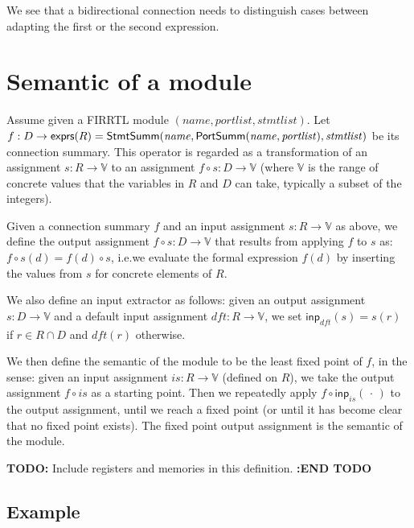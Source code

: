 \documentclass[a4paper]{article}
\newcommand{\portsem}{\mathsf{PortSumm}}
\newcommand{\stmtsem}{\mathsf{StmtSumm}}
\newcommand{\expressions}{\mathsf{exprs}}
\newcommand{\extractinput}[2]{\mathsf{inp}_{#2}(#1)}
\begin{document}
We see that a bidirectional connection needs to distinguish cases between adapting the first or the second expression.

\section{Semantic of a module}

Assume given a FIRRTL module $(\mathit{name}, \mathit{portlist}, \mathit{stmtlist})$.
Let $f: D \to \expressions(R) = \stmtsem(\mathit{name}, \linebreak[0] \portsem(\mathit{name}, \linebreak[0] \mathit{portlist}), \linebreak[0] \mathit{stmtlist})$ be its connection summary.
This operator is regarded as a transformation of an assignment $s: R \to \mathbb{V}$
to an assignment $f \circ s: D \to \mathbb{V}$
(where $\mathbb{V}$ is the range of concrete values that the variables in $R$ and $D$ can take, typically a subset of the integers).

Given a connection summary $f$ and an input assignment $s: R \to \mathbb{V}$ as above, we define the output assignment $f \circ s: D \to \mathbb{V}$ that results from applying $f$ to $s$ as:
$f \circ s(d) = f(d) \circ s$, i.e.\@ we evaluate the formal expression $f(d)$ by inserting the values from $s$ for concrete elements of $R$.

We also define an input extractor as follows: given an output assignment $s : D \to \mathbb{V}$ and a default input assignment $\mathit{dft} : R \to \mathbb{V}$,
we set $\extractinput{s}{\mathit{dft}} = s(r)$ if $r \in R \cap D$ and $\mathit{dft}(r)$ otherwise.

We then define the semantic of the module to be the least fixed point of $f$, in the sense:
given an input assignment $\mathit{is} : R \to \mathbb{V}$ (defined on $R$),
we take the output assignment $f \circ \mathit{is}$ as a starting point.
Then we repeatedly apply $f \circ \extractinput{\,\cdot\,}{\mathit{is}}$ to the output assignment, until we reach a fixed point
(or until it has become clear that no fixed point exists).
The fixed point output assignment is the semantic of the module.

\textbf{TODO:} Include registers and memories in this definition. \textbf{:END TODO}

\subsection{Example}
\end{document}
